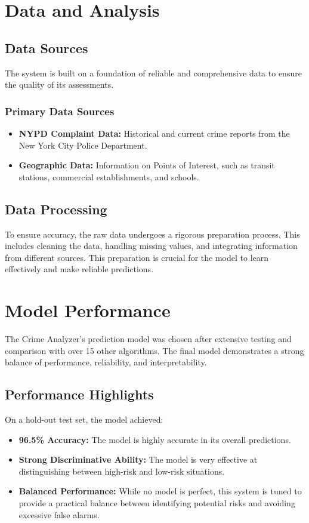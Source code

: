 \documentclass[11pt]{article}
\begin{document}
\section{Data and Analysis}

\subsection{Data Sources}
The system is built on a foundation of reliable and comprehensive data to ensure the quality of its assessments.

\subsubsection{Primary Data Sources}
\begin{itemize}[leftmargin=*]
\item \textbf{NYPD Complaint Data:} Historical and current crime reports from the New York City Police Department.
\item \textbf{Geographic Data:} Information on Points of Interest, such as transit stations, commercial establishments, and schools.
\end{itemize}

\subsection{Data Processing}
To ensure accuracy, the raw data undergoes a rigorous preparation process. This includes cleaning the data, handling missing values, and integrating information from different sources. This preparation is crucial for the model to learn effectively and make reliable predictions.

\section{Model Performance}
The Crime Analyzer's prediction model was chosen after extensive testing and comparison with over 15 other algorithms. The final model demonstrates a strong balance of performance, reliability, and interpretability.

\subsection{Performance Highlights}
On a hold-out test set, the model achieved:
\begin{itemize}[leftmargin=*]
\item \textbf{96.5\% Accuracy:} The model is highly accurate in its overall predictions.
\item \textbf{Strong Discriminative Ability:} The model is very effective at distinguishing between high-risk and low-risk situations.
\item \textbf{Balanced Performance:} While no model is perfect, this system is tuned to provide a practical balance between identifying potential risks and avoiding excessive false alarms.
\end{itemize}
\end{document}
